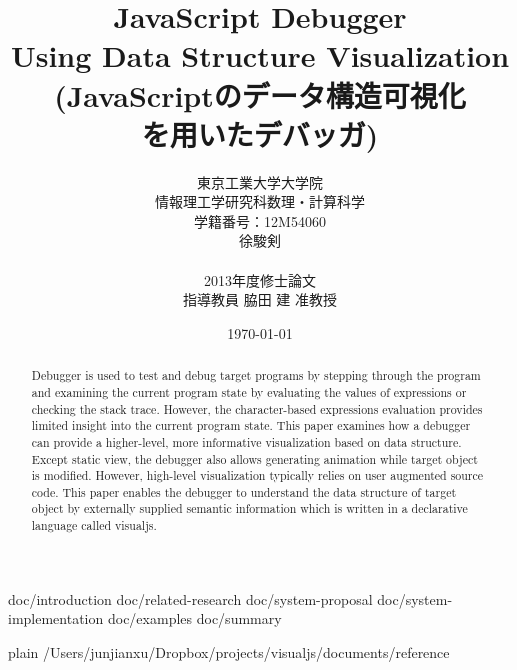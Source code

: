 \documentclass [a4paper,11pt,fleqn]{report}
\title {JavaScript Debugger\\Using Data Structure Visualization\\(JavaScriptのデータ構造可視化\\を用いたデバッガ)}
\author {東京工業大学大学院\\情報理工学研究科数理・計算科学\\学籍番号：12M54060\\徐駿剣\\\\2013年度修士論文\\指導教員 脇田 建 准教授}
\date {\today}
\begin{document}
\maketitle

\begin {abstract}
Debugger is used to test and debug target programs by stepping through the program and examining the current program state by evaluating the values of expressions or checking the stack trace. However, the character-based expressions evaluation provides limited insight into the current program state. This paper examines how a debugger can provide a higher-level, more informative visualization based on data structure. Except static view, the debugger also allows generating animation while target object is modified. However, high-level visualization typically relies on user augmented source code. This paper enables the debugger to understand the data structure of target object by externally supplied semantic information which is written in a declarative language called visualjs.
\end {abstract}

\tableofcontents
\listoffigures
\listoftables

 {doc/introduction}
 {doc/related-research}
 {doc/system-proposal}
 {doc/system-implementation}
 {doc/examples}
 {doc/summary}

 {plain}
 {/Users/junjianxu/Dropbox/projects/visualjs/documents/reference}
\end{document}
